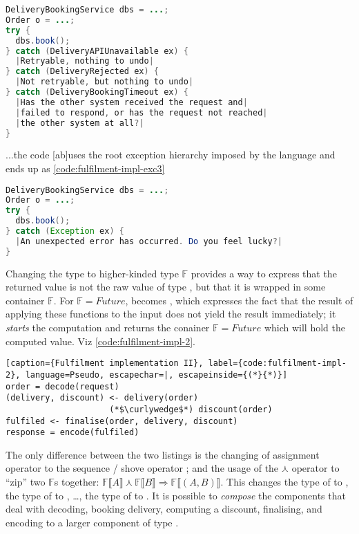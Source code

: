 \begin{lstlisting}[caption={Exceptions}, label={code:fulfilment-impl-exc2}, language=Java, escapechar=|]
DeliveryBookingService dbs = ...;
Order o = ...;
try {
  dbs.book();
} catch (DeliveryAPIUnavailable ex) { 
  |Retryable, nothing to undo|
} catch (DeliveryRejected ex) {
  |Not retryable, but nothing to undo|
} catch (DeliveryBookingTimeout ex) {
  |Has the other system received the request and|
  |failed to respond, or has the request not reached|
  |the other system at all?|
}
\end{lstlisting}

...the code [ab]uses the root exception hierarchy imposed by the language and ends up as \autoref{code:fulfilment-impl-exc3}

\begin{lstlisting}[caption={Exceptions}, label={code:fulfilment-impl-exc3}, language=Java, escapechar=|]
DeliveryBookingService dbs = ...;
Order o = ...;
try {
  dbs.book();
} catch (Exception ex) { 
  |An unexpected error has occurred. Do you feel lucky?|
}
\end{lstlisting}

Changing the type  to higher-kinded type $\mathds{F}$ provides a way to express that the returned value is not the raw value of type , but that it is wrapped in some container $\mathds{F}$. For $\mathds{F} = Future$,  becomes , which expresses the fact that the result of applying these functions to the input does not yield the result immediately; it \emph{starts} the computation and returns the conainer $\mathds{F} = Future$ which will hold the computed value. Viz \autoref{code:fulfilment-impl-2}.

\begin{lstlisting}[caption={Fulfilment implementation II}, label={code:fulfilment-impl-2}, language=Pseudo, escapechar=|, escapeinside={(*}{*)}]
order = decode(request)
(delivery, discount) <- delivery(order) 
                     (*$\curlywedge$*) discount(order)
fulfiled <- finalise(order, delivery, discount)
response = encode(fulfiled)
\end{lstlisting}

The only difference between the two listings is the changing of assignment operator \pcode{=} to the sequence / shove operator \pcode{<-}; and the usage of the $\curlywedge$ operator to ``zip'' two $\mathds{F}$s together: $\mathds{F}\lBrack{}A\rBrack \curlywedge \mathds{F}\lBrack{}B\rBrack \Rightarrow \mathds{F}\lBrack(A, B)\rBrack$. This changes the type of  to , the type of  to , \ldots, the type of  to . It is possible to \emph{compose} the components that deal with decoding, booking delivery, computing a discount, finalising, and encoding to a larger component of type .

